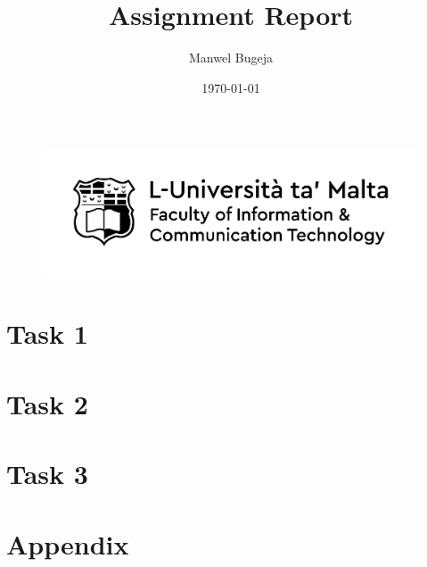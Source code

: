 \documentclass[a4paper, 12pt]{report}
\begin{document}
\begin{figure}
    \centering
    \includegraphics[width=1\textwidth]{ICT_logo}
\end{figure}

\title{Assignment Report}
\author{Manwel Bugeja}
\date{\today}
\maketitle

\tableofcontents
\newpage


\section{Task 1}
\section{Task 2}
\section{Task 3}
\section{Appendix}

% 
\end{document}
